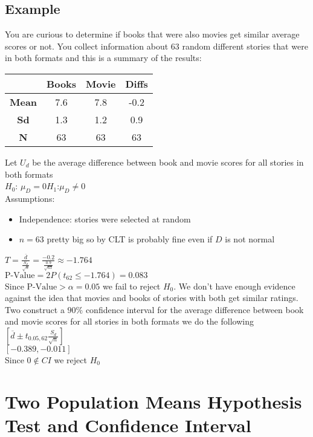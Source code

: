 \documentclass{article}
\begin{document}
 \subsection{Example}
 You are curious to determine if books that were also movies get similar average scores or not. You collect information about 63 random different stories that were in both formats and this is a summary of the
results:
\begin{center}
    \begin{tabular}{c|c|c|c}
         & \textbf{Books} & \textbf{Movie} & \textbf{Diffs} \\
         \hline
        \textbf{Mean} & 7.6 & 7.8 & -0.2\\
        \hline
        \textbf{Sd} & 1.3 & 1.2 & 0.9\\
        \hline
        \textbf{N} & 63 & 63 & 63
    \end{tabular}
\end{center}
Let $U_d$ be the average difference between book and movie scores for all stories in both formats\\
$H_0$: $\mu_D=0$\hspace*{0.5in}$H_1$:$\mu_D\neq 0$\\
Assumptions:
\begin{itemize}
    \item Independence: stories were selected at random
    \item $n=63$ pretty big so by CLT is probably fine even if $D$ is not normal
\end{itemize}
$T=\frac{\overline{d}}{\frac{S_d}{\sqrt{n}}}=\frac{-0.2}{\frac{0.9}{\sqrt{63}}}\approx-1.764$\\
$\text{P-Value}=2P(t_{62}\leq-1.764)=0.083$\\
Since $\text{P-Value}>\alpha=0.05$ we fail to reject $H_0$. We don't have enough evidence against the idea that movies and books of stories with both get similar ratings.\\
\newline
Two construct a $90\%$ confidence interval for the average difference between book and movie scores for all stories in both formats we do the following\\
$[\overline{d}\pm t_{0.05,62}\frac{S_d}{\sqrt{n}}]$\\
$[-0.389,-0.011]$\\
Since $0\notin CI$ we reject $H_0$
\newpage
\section{Two Population Means Hypothesis Test and Confidence Interval}
\label{sec:twoP}
\end{document}
